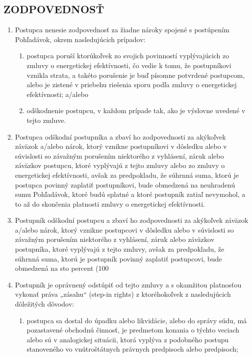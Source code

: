 \documentclass[a4paper]{article}
\begin{document}
\begin{multicols}{2}
\subsection{ZODPOVEDNOSŤ}
\begin{enumerate}
\item Postupca nenesie zodpovednosť za žiadne nároky spojené s postúpením Pohľadávok, okrem nasledujúcich prípadov: 
\begin{enumerate}
\item postupca poruší ktorúkoľvek zo svojich povinností vyplývajúcich zo zmluvy o energetickej efektívnosti, čo vedie k tomu, že postupníkovi vznikla strata, a takéto porušenie je buď písomne potvrdené postupcom, alebo je zistené v priebehu riešenia sporu podľa zmluvy o energetickej efektívnosti; a/alebo
\item odškodnenie postupcu, v každom prípade tak, ako je výslovne uvedené v tejto zmluve.  
\end{enumerate} 
\item Postupca odškodní postupníka a zbaví ho zodpovednosti za akýkoľvek záväzok a/alebo nárok, ktorý vznikne postupníkovi v dôsledku alebo v súvislosti so závažným porušením niektorého z vyhlásení, záruk alebo záväzkov postupcu, ktoré vyplývajú z tejto zmluvy alebo zo zmluvy o energetickej efektívnosti, avšak za predpokladu, že súhrnná suma, ktorú je postupca povinný zaplatiť postupníkovi, bude obmedzená na neuhradenú sumu Pohľadávok, ktoré budú splatné a ktoré postupník zatiaľ nevymohol, a to až do skončenia platnosti zmluvy o energetickej efektívnosti.
\item Postupník odškodní postupcu a zbaví ho zodpovednosti za akýkoľvek záväzok a/alebo nárok, ktorý vznikne postupcovi v dôsledku alebo v súvislosti so závažným porušením niektorého z vyhlásení, záruk alebo záväzkov postupníka, ktoré vyplývajú z tejto zmluvy, avšak za predpokladu, že súhrnná suma, ktorú je postupník povinný zaplatiť postupcovi, bude obmedzená na sto percent (100 %
\item Postupník je oprávnený odstúpiť od tejto zmluvy a s okamžitou platnosťou vykonať práva „zásahu“ (step-in rights) z ktoréhokoľvek z nasledujúcich dôležitých dôvodov: 
\begin{enumerate}
\item postupca sa dostal do úpadku alebo likvidácie, alebo do správy súdu, má pozastavené obchodnú činnosť, je predmetom konania o týchto veciach alebo sú v analogickej situácii, ktorá vyplýva z podobného postupu stanoveného vo vnútroštátnych právnych predpisoch alebo predpisoch;

\end{enumerate}
\end{enumerate}
\end{multicols}
\end{document}
